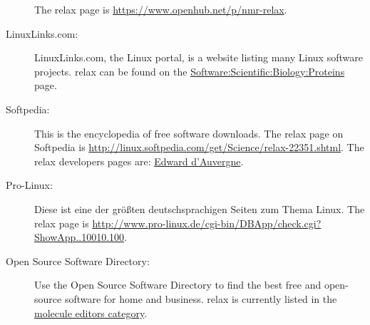 \begin{description}
    The relax page is \url{https://www.openhub.net/p/nmr-relax}.
  \item[LinuxLinks.com:]  LinuxLinks.com, the Linux portal, is a website listing many Linux software projects.
    relax can be found on the \href{http://linuxlinks.com/Software/Scientific/Biology/Proteins/}{Software:\-Scientific:\-Biology:\-Proteins} page.
  \item[Softpedia:]  This is the encyclopedia of free software downloads.
    The relax page on Softpedia is \url{http://linux.softpedia.com/get/Science/relax-22351.shtml}.
    The relax developers pages are:  \href{http://linux.softpedia.com/developer/Edward-d-039-Auvergne-5136.html}{Edward d'Auvergne}.
  \item[Pro-Linux:]  Diese ist eine der gr\"o{\ss}ten deutschsprachigen Seiten zum Thema Linux.
    The relax page is \url{http://www.pro-linux.de/cgi-bin/DBApp/check.cgi?ShowApp..10010.100}.
  \item[Open Source Software Directory:]  Use the Open Source Software Directory to find the best free and open-source software for home and business.
    relax is currently listed in the \href{https://opensourcesoftwaredirectory.com/Scientific/Molecule-Editors}{molecule editors category}.
\end{description}

